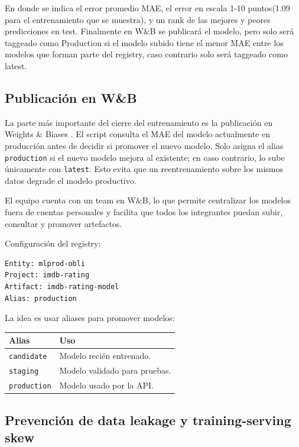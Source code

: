 \documentclass[letterpaper,12pt]{article}
\begin{document}
En donde se indica el error promedio MAE, el error en escala 1-10 puntos(1.09 para el entrenamiento que se muestra), y un rank de las mejores y peores predicciones en test.
Finalmente en W\&B se publicará el modelo, pero solo será taggeado como Production si el modelo subido tiene el menor MAE entre los modelos que forman parte del registry, caso contrario solo será taggeado como latest. 


\subsection{Publicación en W\&B}

La parte más importante del cierre del entrenamiento es la publicación en Weights \& Biases \citep{wandb}. El script consulta el MAE del modelo actualmente en producción antes de decidir si promover el nuevo modelo. Solo asigna el alias \texttt{production} si el nuevo modelo mejora al existente; en caso contrario, lo sube únicamente con \texttt{latest}. Esto evita que un reentrenamiento sobre los mismos datos degrade el modelo productivo.

El equipo cuenta con un team en W\&B, lo que permite centralizar los modelos fuera de cuentas personales y facilita que todos los integrantes puedan subir, consultar y promover artefactos.

Configuración del registry:

\begin{lstlisting}
Entity: mlprod-obli
Project: imdb-rating
Artifact: imdb-rating-model
Alias: production
\end{lstlisting}

La idea es usar aliases para promover modelos:

\begin{longtable}{p{4cm}p{12cm}}
\toprule
\textbf{Alias} & \textbf{Uso} \\
\midrule
\texttt{candidate} & Modelo recién entrenado. \\
\texttt{staging} & Modelo validado para pruebas. \\
\texttt{production} & Modelo usado por la API. \\
\bottomrule
\end{longtable}

\subsection{Prevención de data leakage y training-serving skew}
\label{sec:leakage-skew}
\end{document}
